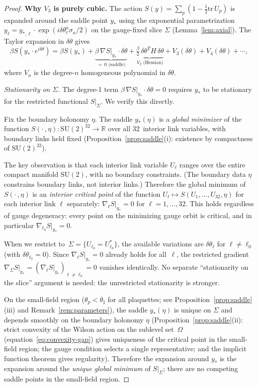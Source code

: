 \documentclass[11pt]{article}
\theoremstyle{definition}
\newcommand{\SU}{\mathrm{SU}}
\newcommand{\tr}{\mathrm{tr}}
\newcommand{\R}{\mathbb{R}}
\begin{document}
\begin{proof}
\textbf{Why $V_3$ is purely cubic.}
The action $S(y)=\sum_p(1-\frac{1}{2}\tr\,U_p)$ is expanded around
the saddle point $y_*$ using the exponential parametrization
$y_\ell=y_{*,\ell}\cdot\exp(i\delta\theta_\ell^a\sigma_a/2)$ on
the gauge-fixed slice $\Sigma$
(Lemma~\ref{lem:axial}).  The Taylor expansion in
$\delta\theta$ gives
\begin{equation}\label{eq:Sexpand}
\beta S(y_*\cdot e^{i\delta\theta})
=\beta S(y_*)+\underbrace{\beta\,\nabla S|_{y_*}\cdot\delta\theta}%
_{=\,0\text{ (saddle)}}
+\underbrace{\tfrac{\beta}{2}\,\delta\theta^T H\,\delta\theta}%
_{V_2\text{ (Hessian)}}
+V_3(\delta\theta)+V_4(\delta\theta)+\cdots,
\end{equation}
where $V_n$ is the degree-$n$ homogeneous polynomial in $\delta\theta$.

\emph{Stationarity on $\Sigma$.}
The degree-1 term $\beta\,\nabla S|_{y_*}\cdot\delta\theta=0$
requires $y_*$ to be stationary for the restricted functional
$S|_\Sigma$.  We verify this directly.

Fix the boundary holonomy $\eta$.  The saddle $y_*(\eta)$ is
a \emph{global minimizer} of the function
$S(\cdot\,,\eta):\SU(2)^{32}\to\R$ over all
32~interior link variables, with boundary links held fixed
(Proposition~\ref{prop:saddle}(i): existence by compactness of
$\SU(2)^{32}$).

The key observation is that each interior link variable
$U_\ell$ ranges over the entire compact manifold $\SU(2)$,
with no boundary constraints.  (The boundary data $\eta$
constrains boundary links, not interior links.)
Therefore the global minimum of $S(\cdot\,,\eta)$ is an
\emph{interior critical point} of the function
$U_\ell\mapsto S(U_1,\ldots,U_{32},\eta)$ for each interior
link $\ell$ separately: $\nabla_\ell S|_{y_*}=0$ for
$\ell=1,\ldots,32$.  This holds regardless of gauge
degeneracy: every point on the minimizing gauge orbit is
critical, and in particular $\nabla_{\ell_0}S|_{y_*}=0$.

When we restrict to~$\Sigma=\{U_{\ell_0}=U_{\ell_0}^*\}$, the
available variations are $\delta\theta_\ell$ for $\ell\ne\ell_0$
(with $\delta\theta_{\ell_0}=0$).  Since
$\nabla_\ell S|_{y_*}=0$ already holds for all~$\ell$, the
restricted gradient $\nabla_\Sigma S|_{y_*}
=(\nabla_\ell S|_{y_*})_{\ell\ne\ell_0}=0$ vanishes
identically.  No separate ``stationarity on the
slice'' argument is needed: the unrestricted stationarity is
stronger.

On the small-field
region ($\theta_p<\theta_\sharp$ for all plaquettes;
see Proposition~\ref{prop:saddle}(iii) and
Remark~\ref{rem:parameters}), the
saddle $y_*(\eta)$ is unique on $\Sigma$ and
depends smoothly on the boundary holonomy $\eta$
(Proposition~\ref{prop:saddle}(ii): strict convexity of the
Wilson action on the sublevel set~$\Omega$
(equation~\eqref{eq:convexity-gap}) gives
uniqueness of the critical point in the small-field region;
the gauge condition selects a single
representative; and the implicit function theorem gives regularity).
Therefore the expansion around $y_*$ is the expansion around the
\emph{unique global minimum} of $S|_\Sigma$; there are no
competing saddle points in the small-field region.


\end{proof}
\end{document}
